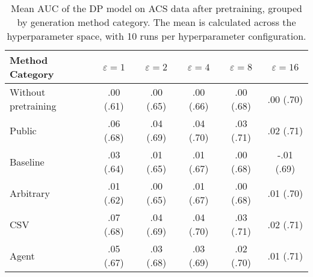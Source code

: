 \begin{table}[h!]
    \centering
    \caption{Mean AUC of the DP model on ACS data after pretraining, grouped by generation method category. The mean is calculated across the hyperparameter space, with 10 runs per hyperparameter configuration.}
    \label{tab:epsilon_comparison}
    \begin{tabular}{lccccc}
    \toprule
    Method Category & $\varepsilon=1$ & $\varepsilon=2$ & $\varepsilon=4$ & $\varepsilon=8$ & $\varepsilon=16$ \\
    \midrule
    Without pretraining & .00 {\small (.61)} & .00 {\small (.65)} & .00 {\small (.66)} & .00 {\small (.68)} & .00 {\small (.70)} \\
    \arrayrulecolor{black!50!}\midrule
    Public & \cellcolor{silver!30}.06 {\small (.68)} & \cellcolor{silver!30}.04 {\small (.69)} & \cellcolor{silver!30}.04 {\small (.70)} & \cellcolor{silver!30}.03 {\small (.71)} & \cellcolor{gold!30}.02 {\small (.71)} \\
    \arrayrulecolor{black!50!}\midrule
    Baseline & .03 {\small (.64)} & .01 {\small (.65)} & .01 {\small (.67)} & .00 {\small (.68)} & -.01 {\small (.69)} \\
    \arrayrulecolor{black!50!}\midrule
    Arbitrary & .01 {\small (.62)} & .00 {\small (.65)} & .01 {\small (.67)} & .00 {\small (.68)} & .01 {\small (.70)} \\
    \arrayrulecolor{black!50!}\midrule
    CSV & \cellcolor{gold!30}.07 {\small (.68)} & \cellcolor{gold!30}.04 {\small (.69)} & \cellcolor{gold!30}.04 {\small (.70)} & \cellcolor{gold!30}.03 {\small (.71)} & \cellcolor{silver!30}.02 {\small (.71)} \\
    Agent & \cellcolor{bronze!30}.05 {\small (.67)} & \cellcolor{bronze!30}.03 {\small (.68)} & \cellcolor{bronze!30}.03 {\small (.69)} & \cellcolor{bronze!30}.02 {\small (.70)} & \cellcolor{bronze!30}.01 {\small (.71)} \\
    \bottomrule
    \end{tabular}
\end{table}